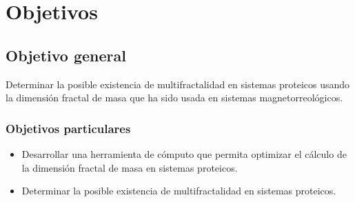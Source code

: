 \chapter{Objetivos}
\section{Objetivo general}

Determinar la posible existencia de multifractalidad en sistemas proteicos usando la dimensión fractal de masa que ha sido usada en sistemas magnetorreológicos. 

\subsection{Objetivos particulares}

\begin{itemize}

\item Desarrollar una herramienta de cómputo que permita optimizar el cálculo de la dimensión fractal de masa en sistemas proteicos.

\item Determinar la posible existencia de multifractalidad en sistemas proteicos.

\end{itemize}